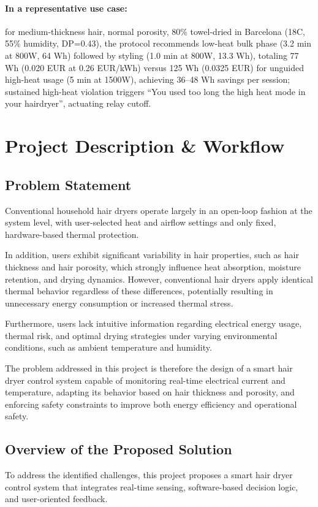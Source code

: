 \documentclass[11pt,a4paper]{article}
\begin{document}
\paragraph{In a representative use case:} for medium-thickness hair, normal porosity, 80\% towel-dried in Barcelona (18\textdegree C, 55\% humidity, DP=0.43), the protocol recommends low-heat bulk phase (3.2 min at 800W, 64 Wh) followed by styling (1.0 min at 800W, 13.3 Wh), totaling 77 Wh (0.020 EUR at 0.26 EUR/kWh) versus 125 Wh (0.0325 EUR) for unguided high-heat usage (5 min at 1500W), achieving 36--48 Wh savings per session; sustained high-heat violation triggers ``You used too long the high heat mode in your hairdryer'', actuating relay cutoff.

\newpage
\section{Project Description \& Workflow}

\subsection{Problem Statement}
Conventional household hair dryers operate largely in an open-loop fashion at the system level, with user-selected heat and airflow settings and only fixed, hardware-based thermal protection.

In addition, users exhibit significant variability in hair properties, such as hair thickness and hair porosity, which strongly influence heat absorption, moisture retention, and drying dynamics. However, conventional hair dryers apply identical thermal behavior regardless of these differences, potentially resulting in unnecessary energy consumption or increased thermal stress.

Furthermore, users lack intuitive information regarding electrical energy usage, thermal risk, and optimal drying strategies under varying environmental conditions, such as ambient temperature and humidity.

The problem addressed in this project is therefore the design of a smart hair dryer control system capable of monitoring real-time electrical current and temperature, adapting its behavior based on hair thickness and porosity, and enforcing safety constraints to improve both energy efficiency and operational safety.
\subsection{Overview of the Proposed Solution}
To address the identified challenges, this project proposes a smart hair dryer control system that integrates real-time sensing, software-based decision logic, and user-oriented feedback.
\end{document}
